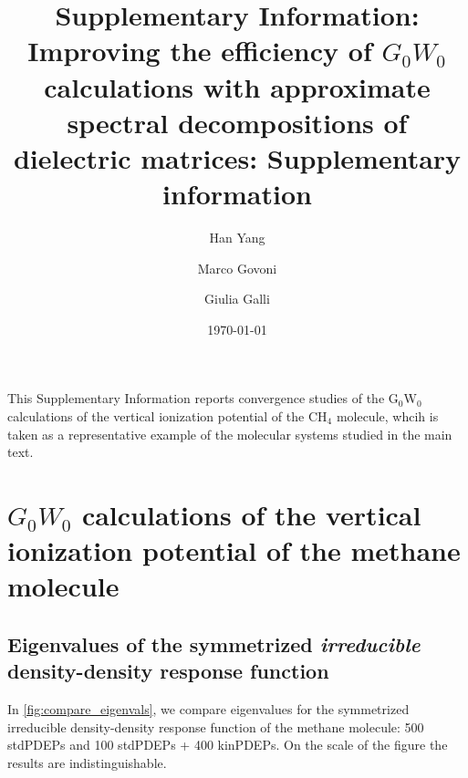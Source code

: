 \documentclass[aip]{revtex4-1}
\begin{document}
\title{Supplementary Information:
Improving the efficiency of $G_0W_0$ calculations with approximate spectral decompositions of dielectric matrices: Supplementary information}
\renewcommand{\figureautorefname}{Fig.}

\author{Han Yang}

\author{Marco Govoni}


\author{Giulia Galli}

\date{\today}

\maketitle

This Supplementary Information reports convergence studies of the G$_0$W$_0$ calculations of the vertical ionization potential of the CH$_4$ molecule, whcih is taken as a representative example of the molecular systems studied in the main text.

\section*{$G_0W_0$ calculations of the vertical ionization potential of the methane molecule}
\subsection{Eigenvalues of the symmetrized \textit{irreducible} density-density response function}
In \autoref{fig:compare_eigenvals}, we  compare eigenvalues for the symmetrized irreducible density-density response function of the methane molecule: 500 stdPDEPs and 100 stdPDEPs +  400 kinPDEPs. On the scale of the figure the results are indistinguishable.
\end{document}
